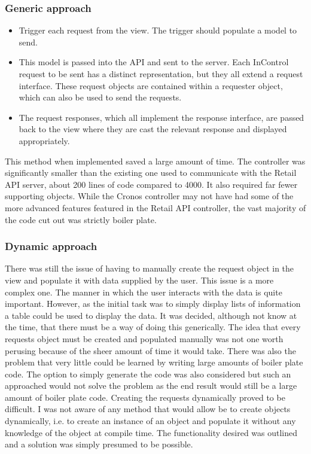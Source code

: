 \documentclass[a4paper, 11pt, titlepage]{article}
\begin{document}
\subsubsection{Generic approach} 
\begin{itemize} 
\item Trigger each request from the view. The trigger should populate a model to send. \label{cronos_generic_api} 
\item This model is passed into the API and sent to the server. Each InControl request to be sent has a distinct representation, but they all extend a request interface. These request objects are contained within a requester object, which can also be used to send the requests. 
\item The request responses, which all implement the response interface, are passed back to the view where they are cast the relevant response and displayed appropriately. 
\end{itemize} 
This method when implemented saved a large amount of time. The controller was significantly smaller than the existing one used to communicate with the Retail API server, about 200 lines of code compared to 4000. It also required far fewer supporting objects. While the Cronos controller may not have had some of the more advanced features featured in the Retail API controller, the vast majority of the code cut out was strictly boiler plate. 
\subsubsection{Dynamic approach} \label{dynamic_smart}
There was still the issue of having to manually create the request object in the view and populate it with data supplied by the user. This issue is a more complex one. The manner in which the user interacts with the data is quite important. However, as the initial task was to simply display lists of information a table could be used to display the data. It was decided, although not know at the time, that there must be a way of doing this generically. The idea that every requests object must be created and populated manually was not one worth perusing because of the sheer amount of time it would take. There was also the problem that very little could be learned by writing large amounts of boiler plate code. The option to simply generate the code was also considered but such an approached would not solve the problem as the end result would still be a large amount of boiler plate code. Creating the requests dynamically proved to be difficult. I was not aware of any method that would allow be to create objects dynamically, i.e. to create an instance of an object and populate it without any knowledge of the object at compile time. The functionality desired was outlined and a solution was simply presumed to be possible.  
\end{document}
